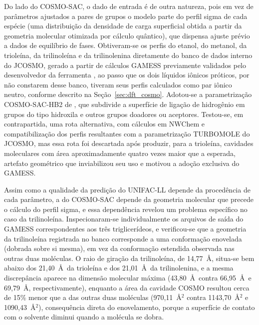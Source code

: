 Do lado do COSMO-SAC, o dado de entrada é de outra natureza, pois em vez de parâmetros ajustados a pares de grupos o modelo parte do perfil sigma de cada espécie (uma distribuição da densidade de carga superficial obtida a partir da geometria molecular otimizada por cálculo quântico), que dispensa ajuste prévio a dados de equilíbrio de fases. Obtiveram-se os perfis do etanol, do metanol, da trioleína, da trilinoleína e da trilinolenina diretamente do banco de dados interno do JCOSMO, gerado a partir de cálculos GAMESS previamente validados pelo desenvolvedor da ferramenta \cite{ferrarini2018}, ao passo que os dois líquidos iônicos próticos, por não constarem desse banco, tiveram seus perfis calculados como par iônico neutro, conforme descrito na Seção~\ref{sec:dft_cosmo}. Adotou-se a parametrização COSMO-SAC-HB2 de , que subdivide a superfície de ligação de hidrogênio em grupos do tipo hidroxila e outros grupos doadores ou aceptores. Testou-se, em contrapartida, uma rota alternativa, com cálculos em NWChem e compatibilização dos perfis resultantes com a parametrização TURBOMOLE do JCOSMO, mas essa rota foi descartada após produzir, para a trioleína, cavidades moleculares com área aproximadamente quatro vezes maior que a esperada, artefato geométrico que inviabilizou seu uso e motivou a adoção exclusiva do GAMESS.

Assim como a qualidade da predição do UNIFAC-LL depende da procedência de cada parâmetro, a do COSMO-SAC depende da geometria molecular que precede o cálculo do perfil sigma, e essa dependência revelou um problema específico no caso da trilinoleína. Inspecionaram-se individualmente os arquivos de saída do GAMESS correspondentes aos três triglicerídeos, e verificou-se que a geometria da trilinoleína registrada no banco corresponde a uma conformação enovelada (dobrada sobre si mesma), em vez da conformação estendida observada nas outras duas moléculas. O raio de giração da trilinoleína, de 14,77~\AA, situa-se bem abaixo dos 21,40~\AA\ da trioleína e dos 21,01~\AA\ da trilinolenina, e a mesma discrepância aparece na dimensão molecular máxima (43,80~\AA\ contra 66,95~\AA\ e 69,79~\AA, respectivamente), enquanto a área da cavidade COSMO resultou cerca de 15\% menor que a das outras duas moléculas (970,11~\AA$^2$ contra 1143,70~\AA$^2$ e 1090,43~\AA$^2$), consequência direta do enovelamento, porque a superfície de contato com o solvente diminui quando a molécula se dobra.

